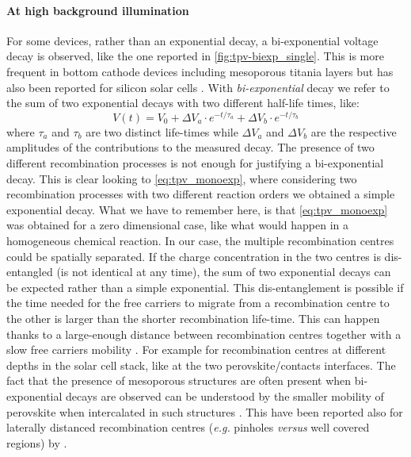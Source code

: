 		\paragraph{At high background illumination}
		For some devices, rather than an exponential decay, a bi\hyp{}exponential voltage decay is observed, like the one reported in \cref{fig:tpv-biexp_single}.
		This is more frequent in bottom cathode devices including mesoporous titania layers \cite{Carnie2015,ORegan2015b,Bertoluzzi2015} but has also been reported for silicon solar cells \cite{Kiermasch2018}.
		With \emph{bi\hyp{}exponential} decay we refer to the sum of two exponential decays with two different half\hyp{}life times, like:
		\begin{equation}\label{eq:tpv_biexp}
			V (t) = V_0 + \Delta V_a \cdot e^{-t/\tau_a} + \Delta V_b \cdot e^{-t/\tau_b}
		\end{equation}
		where $\tau_a$ and $\tau_b$ are two distinct life\hyp{}times while $\Delta V_a$ and $\Delta V_b$ are the respective amplitudes of the contributions to the measured decay.
		The presence of two different recombination processes is not enough for justifying a bi\hyp{}exponential decay.
		This is clear looking to \cref{eq:tpv_monoexp}, where considering two recombination processes with two different reaction orders we obtained a simple exponential decay.
		What we have to remember here, is that \cref{eq:tpv_monoexp} was obtained for a zero dimensional case, like what would happen in a homogeneous chemical reaction.
		In our case, the multiple recombination centres could be spatially separated.
		If the charge concentration in the two centres is dis\hyp{}entangled (is not identical at any time), the sum of two exponential decays can be expected rather than a simple exponential.
		This dis\hyp{}entanglement is possible if the time needed for the free carriers to migrate from a recombination centre to the other is larger than the shorter recombination life\hyp{}time.
		This can happen thanks to a large\hyp{}enough distance between recombination centres together with a slow free carriers mobility \cite{Calado2018}.
		For example for recombination centres at different depths in the solar cell stack, like at the two perovskite/contacts interfaces.
		The fact that the presence of mesoporous structures are often present when bi\hyp{}exponential decays are observed can be understood by the smaller mobility of perovskite when intercalated in such structures \cite{Leijtens2014}.
		This have been reported also for laterally distanced recombination centres (\textsl{e.g.} pinholes \textsl{versus} well covered regions) by .

